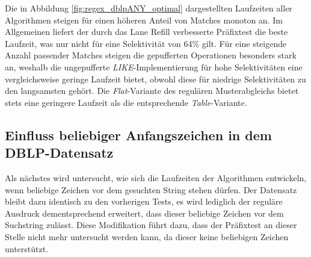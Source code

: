 Die in Abbildung \ref{fig:regex_dblpANY_optimal} dargestellten Laufzeiten aller Algorithmen steigen für einen höheren Anteil von Matches monoton an.
Im Allgemeinen liefert der durch das Lane Refill verbesserte Präfixtest die beste Laufzeit, was nur nicht für eine Selektivität von 64\% gilt.
Für eine steigende Anzahl passender Matches steigen die gepufferten Operationen besonders stark an, weshalb die ungepufferte \emph{LIKE}-Implementierung für hohe Selektivitäten eine vergleichsweise geringe Laufzeit bietet, obwohl diese für niedrige Selektivitäten zu den langsamsten gehört.
Die \emph{Flat}-Variante des regulären Musterabgleichs bietet stets eine geringere Laufzeit als die entsprechende \emph{Table}-Variante.

\subsection{Einfluss beliebiger Anfangszeichen in dem DBLP-Datensatz}
\label{sec:regex_evaluation_beobachtung_4}

Als nächstes wird untersucht, wie sich die Laufzeiten der Algorithmen entwickeln, wenn beliebige Zeichen vor dem gesuchten String stehen dürfen.
Der Datensatz bleibt dazu identisch zu den vorherigen Tests, es wird lediglich der reguläre Ausdruck dementsprechend erweitert, dass dieser beliebige Zeichen vor dem Suchstring zulässt.
Diese Modifikation führt dazu, dass der Präfixtest an dieser Stelle nicht mehr untersucht werden kann, da dieser keine beliebigen Zeichen unterstützt.

